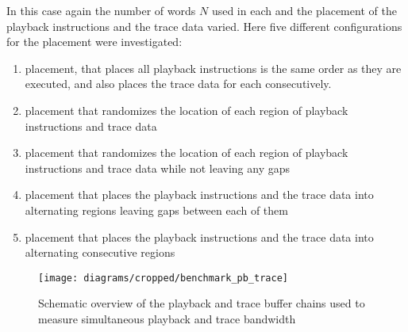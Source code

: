 In this case again the number of words $N$ used in each \descriptor{} and the placement of the playback instructions and the trace data varied.
Here five different configurations for the placement were investigated:
\begin{enumerate}
  \item \linear{} placement, that places all playback instructions is the same order as they are executed, and also places the trace data for each \descriptor{} consecutively.
  \item \random{} placement that randomizes the location of each region of playback instructions and trace data
  \item \randomDense{} placement that randomizes the location of each region of playback instructions and trace data while not leaving any gaps
  \item \interleaved{} placement that places the playback instructions and the trace data into alternating regions leaving gaps between each of them
  \item \interleavedDense{} placement that places the playback instructions and the trace data into alternating consecutive regions
\end{enumerate}

\begin{figure}[htbp]
\centerline{\texttt{[image: diagrams/cropped/benchmark\_pb\_trace]}}
\caption{Schematic overview of the playback and trace buffer chains used to measure simultaneous playback and trace bandwidth}\label{fig:pb_trace_benchmar_setup}
\end{figure}
